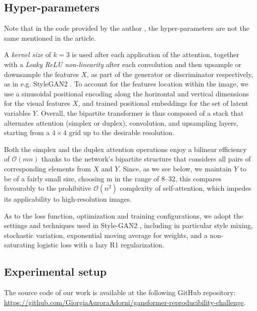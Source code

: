 \documentclass{article}
\begin{document}
	\subsection{Hyper-parameters}\label{sec:hyperparam}%
	
	Note that in the code provided by the author \cite{hudson2021generative}, the hyper-parameters are 
	not the same mentioned in the article. 
	
	A \textit{kernel size} of $k = 3$ is used after each application of the attention, together with a 
	\textit{Leaky ReLU non-linearity} after each convolution and then upsample or downsample the 
	features $X$, as part of the generator or discriminator respectively, as in e.g. StyleGAN2 
	\cite{karras2020analyzing}. 
	To account for the features location within the image, we use a sinusoidal positional encoding along 
	the horizontal and vertical dimensions for the visual features $X$, and trained positional 
	embeddings for the set of latent variables $Y$.
	Overall, the bipartite transformer is thus composed of a stack that alternates attention (simplex or 
	duplex), convolution, and upsampling layers, starting from a $4 \times 4$ grid up to the desirable 
	resolution. 
	
	Both the simplex and the duplex attention operations enjoy a bilinear efficiency of 
	$\mathcal{O}(mn)$ thanks to the network’s bipartite structure that considers all pairs of 
	corresponding elements from $X$ and $Y$. Since, as we see below, we maintain $Y$ to be of a fairly 
	small size, choosing m in the range of 8–32, this compares favourably to the prohibitive 	
	$\mathcal{O}(n^2)$  complexity of self-attention, which impedes its applicability to high-resolution 
	images.
	
	As to the loss function, optimization and training configurations, we adopt the settings and 
	techniques used in Style-GAN2 \cite{karras2020analyzing}, including in particular style mixing, 
	stochastic variation, exponential moving average for weights, and a non-saturating logistic loss with 
	a lazy R1 regularization.
	
	\subsection{Experimental setup}	
	The source code of our work is available at the following GitHub repository: 
	\url{https://github.com/GiorgiaAuroraAdorni/gansformer-reproducibility-challenge}.
	 
\end{document}
